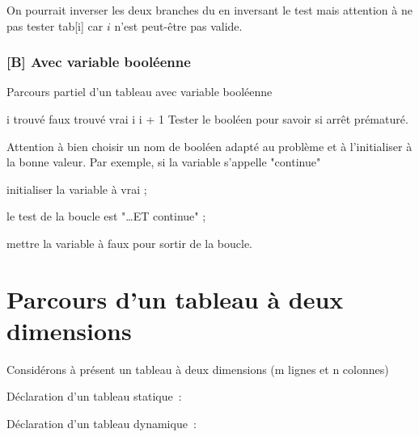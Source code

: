 On pourrait inverser les deux branches du  en inversant le test
mais attention à ne pas tester tab[i] car $i$ n'est peut-être pas valide.

\subsubsection*{[B] Avec variable booléenne}

\begin{algorithm}[H]
\begin{pseudo}
	\caption{Parcours partiel d'un tableau avec variable booléenne}
	\label{algo:parcours1-partiel-avec-bool}
	\Let i 
	\Let trouvé \Gets faux
			\Let trouvé \Gets vrai
		\Else
			\Let i \Gets i + 1
		\EndIf
	\EndWhile
	\LComment Tester le booléen pour savoir si arrêt prématuré.
\end{pseudo}
\end{algorithm}

Attention à bien choisir un nom de booléen adapté au problème
et à l'initialiser à la bonne valeur. 
Par exemple, si la variable s'appelle "continue"
\begin{liste}
\item initialiser la variable à vrai ;
\item le test de la boucle est "\dots ET continue" ;
\item mettre la variable à faux pour sortir de la boucle.
\end{liste}

\section{Parcours d'un tableau à deux dimensions}
\label{algo:Tab2D}

Considérons à présent un tableau à deux dimensions 
(m lignes et n colonnes)

Déclaration d'un tableau statique~:


Déclaration d'un tableau dynamique~:



